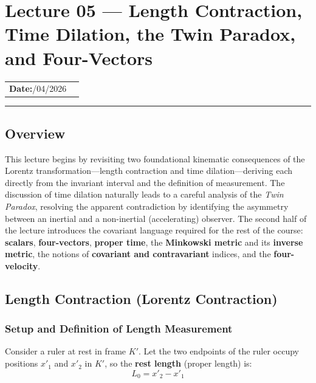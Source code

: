 

\section{Lecture 05 — Length Contraction, Time Dilation, the Twin Paradox, and Four-Vectors}\label{sec:lec05}

\begin{center}
\begin{tabular}{ll}
  \textbf{Date:}\quad 19/04/2026   & \\
\end{tabular}
\end{center}
\hrule\vspace{1.5em}

\subsection*{Overview}
This lecture begins by revisiting two foundational kinematic consequences of the Lorentz transformation—length contraction and time dilation—deriving each directly from the invariant interval and the definition of measurement. The discussion of time dilation naturally leads to a careful analysis of the \textit{Twin Paradox}, resolving the apparent contradiction by identifying the asymmetry between an inertial and a non-inertial (accelerating) observer. The second half of the lecture introduces the covariant language required for the rest of the course: \textbf{scalars}, \textbf{four-vectors}, \textbf{proper time}, the \textbf{Minkowski metric} and its \textbf{inverse metric}, the notions of \textbf{covariant and contravariant} indices, and the \textbf{four-velocity}.

\subsection{Length Contraction (Lorentz Contraction)}

\subsubsection*{Setup and Definition of Length Measurement}

Consider a ruler at rest in frame $K'$. Let the two endpoints of the ruler occupy positions $x'_1$ and $x'_2$ in $K'$, so the \textbf{rest length} (proper length) is:
\begin{equation}\label{eq:lec05:proper-length}
    L_0 = x'_2 - x'_1
\end{equation}

